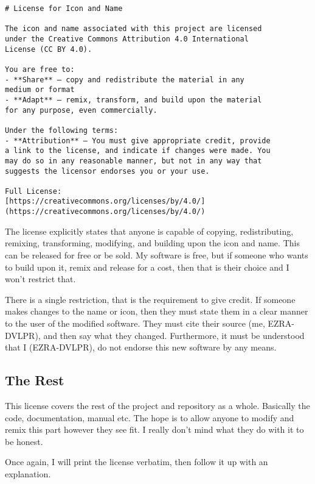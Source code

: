 \newpage

\begin{verbatim}
# License for Icon and Name

The icon and name associated with this project are licensed
under the Creative Commons Attribution 4.0 International
License (CC BY 4.0).

You are free to:
- **Share** — copy and redistribute the material in any
medium or format
- **Adapt** — remix, transform, and build upon the material
for any purpose, even commercially.

Under the following terms:
- **Attribution** — You must give appropriate credit, provide
a link to the license, and indicate if changes were made. You
may do so in any reasonable manner, but not in any way that
suggests the licensor endorses you or your use.

Full License:
[https://creativecommons.org/licenses/by/4.0/]
(https://creativecommons.org/licenses/by/4.0/)
\end{verbatim}

\newpage

The license explicitly states that anyone is capable
of copying, redistributing, remixing, transforming, modifying, and
building upon the icon and name. This can be released for free or
be sold. My software is free, but if someone who wants to build upon
it, remix and release for a cost, then that is their choice and I
won't restrict that.

There is a single restriction, that is the requirement to give
credit. If someone makes changes to the name or icon, then they must
state them in a clear manner to the user of the modified software.
They must cite their source
(me, EZRA-DVLPR), and then say what they changed. Furthermore, it
must be understood that I (EZRA-DVLPR), do not endorse this new
software by any means.

\subsection{The Rest}

This license covers the rest of the project and repository as a
whole. Basically the code, documentation, manual etc. The hope is to
allow anyone to modify and remix this part however they see fit. I
really don't mind what they do with it to be honest.

Once again, I will print the license verbatim, then follow it up with
an explanation.

\newpage

